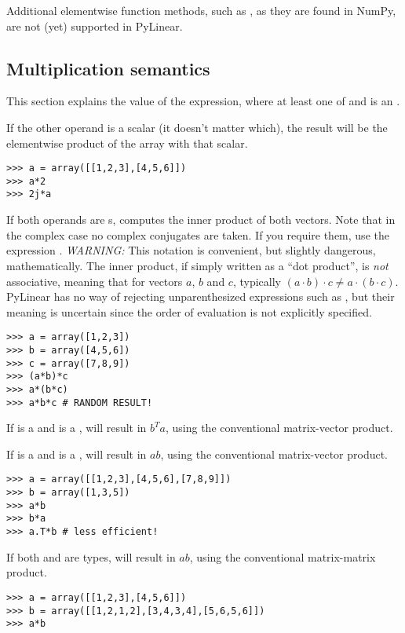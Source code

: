 Additional elementwise function methods, such as , as they are
found in NumPy, are not (yet) supported in PyLinear.

\subsection{Multiplication semantics}
\label{subsec:arraymultiplication}

This section explains the value of the expression, where at
least one of  and  is an .

If the other operand is a scalar (it doesn't matter which), the
result will be the elementwise product of the array with that scalar.
\begin{verbatim}
>>> a = array([[1,2,3],[4,5,6]])
>>> a*2
>>> 2j*a
\end{verbatim}

If both operands are s,  computes the inner
product of both vectors. Note that in the complex case no complex
conjugates are taken. If you require them, use the expression
. \emph{WARNING:} This notation is convenient, but
slightly dangerous, mathematically. The inner product, if simply
written as a ``dot product'', is \emph{not} associative, meaning that
for vectors $a$, $b$ and $c$, typically $(a\cdot b)\cdot
c\not=a\cdot(b\cdot c)$.  PyLinear has no way of rejecting
unparenthesized expressions such as , but their meaning is
uncertain since the order of evaluation is not explicitly specified.

\begin{verbatim}
>>> a = array([1,2,3])
>>> b = array([4,5,6])
>>> c = array([7,8,9])
>>> (a*b)*c
>>> a*(b*c)
>>> a*b*c # RANDOM RESULT!
\end{verbatim}

If  is a  and  is a ,
 will result in $b^Ta$, using the conventional matrix-vector
product.

If  is a  and  is a ,
 will result in $a b$, using the conventional matrix-vector
product.

\begin{verbatim}
>>> a = array([[1,2,3],[4,5,6],[7,8,9]])
>>> b = array([1,3,5])
>>> a*b
>>> b*a
>>> a.T*b # less efficient!
\end{verbatim}

If both  and  are  types,
 will result in $a b$, using the conventional matrix-matrix
product.
\begin{verbatim}
>>> a = array([[1,2,3],[4,5,6]])
>>> b = array([[1,2,1,2],[3,4,3,4],[5,6,5,6]])
>>> a*b
\end{verbatim}

